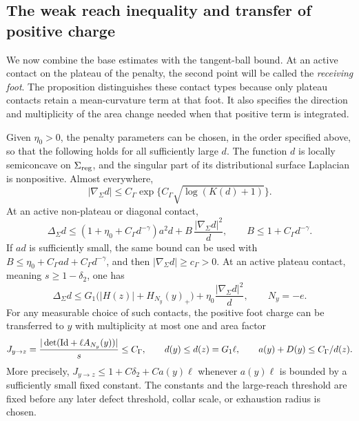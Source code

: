 \subsection{The weak reach inequality and transfer of positive charge}

We now combine the base estimates with the tangent-ball bound.  At an
active contact on the plateau of the penalty, the second point will be
called the \emph{receiving foot}.
The proposition distinguishes these contact types because only plateau
contacts retain a mean-curvature term at that foot.  It also specifies
the direction and multiplicity of the area change needed when that
positive term is integrated.

\begin{proposition}\label{prop:reach-calculus}
Given $\eta_0>0$, the penalty parameters can be chosen, in the order
specified above, so that the following holds for all sufficiently
large $d$.  The function $d$ is locally semiconcave on
$\Sigma_{\rm reg}$, and the singular part of its distributional
surface Laplacian is nonpositive.  Almost everywhere,
\begin{equation}\label{eq:C7}
 |\nabla_\Sigma d|\le
 C_\Gamma\exp\{C_\Gamma\sqrt{\log(K(d)+1)}\}.
\end{equation}
At an active non-plateau or diagonal contact,
\begin{equation}\label{eq:C8}
 \Delta_\Sigma d\le(1+\eta_0+C_\Gamma d^{-\gamma})a^2d
                  +B\,\frac{|\nabla_\Sigma d|^2}{d},
 \qquad B\le1+C_\Gamma d^{-\gamma}.
\end{equation}
If $ad$ is sufficiently small, the same bound can be used with
$B\le\eta_0+C_\Gamma ad+C_\Gamma d^{-\gamma}$, and then
$|\nabla_\Sigma d|\ge c_\Gamma>0$.
At an active plateau contact, meaning $s\ge1-\delta_2$, one has
\begin{equation}\label{eq:C9}
 \Delta_\Sigma d\le
 G_1\bigl(|H(z)|+H_{N_y}(y)_+\bigr)
 +\eta_0\frac{|\nabla_\Sigma d|^2}{d},\qquad N_y=-e.
\end{equation}
For any measurable choice of such contacts, the positive foot charge
can be transferred to $y$ with multiplicity at most one and area factor
\begin{equation}\label{eq:C10}
 J_{y\to z}=
 \frac{|\det(\mathrm{Id}+\ell A_{N_y}(y))|}{s}\le C_\Gamma,
 \qquad d(y)\le d(z)=G_1\ell,
 \qquad a(y)+D(y)\le C_\Gamma/d(z).
\end{equation}
More precisely, $J_{y\to z}\le1+C\delta_2+C a(y)\ell$ whenever
$a(y)\ell$ is bounded by a sufficiently small fixed constant.  The
constants and the large-reach threshold are fixed before any later
defect threshold, collar scale, or exhaustion radius is chosen.
\end{proposition}

